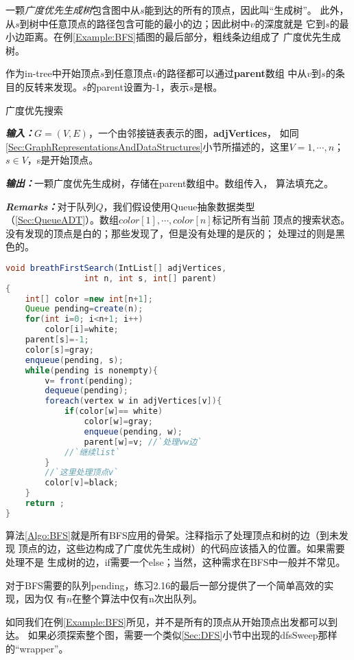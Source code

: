 一颗\emph{广度优先生成树}包含图中从$s$能到达的所有的顶点，因此叫“生成树”。
此外，从$s$到树中任意顶点的路径包含可能的最小的边；因此树中$v$的深度就是
它到$s$的最小边距离。在例\ref{Example:BFS}插图的最后部分，粗线条边组成了
广度优先生成树。

作为in-tree中开始顶点$s$到任意顶点$v$的路径都可以通过{\textbf{parent}}数组
中从$v$到$s$的条目的反转来发现。$s$的parent设置为-1，表示$s$是根。

\begin{algorithm}\label{Algo:BFS}
广度优先搜索

{\textbf{\emph{输入：}}}$G=(V,E)$，一个由邻接链表表示的图，{\textbf{adjVertices}}，
如同\ref{Sec:GraphRepresentationsAndDataStructures}小节所描述的，这里$V={1, \cdots, n}$；
$s\in V$，s是开始顶点。

{\textbf{\emph{输出：}}}一颗广度优先生成树，存储在parent数组中。数组传入，
算法填充之。

{\textbf{\emph{Remarks：}}}对于队列$Q$，我们假设使用Queue抽象数据类型
（\ref{Sec:QueueADT}）。数组$color[1], \cdots, color[n]$标记所有当前
顶点的搜索状态。没有发现的顶点是白的；那些发现了，但是没有处理的是灰的；
处理过的则是黑色的。
\end{algorithm}

\begin{lstlisting}[language={Java},keywordstyle=\color{blue!70}, commentstyle=\color{red!50!green!50!blue!50}]
void breathFirstSearch(IntList[] adjVertices,
                int n, int s, int[] parent)
{
    int[] color =new int[n+1];
    Queue pending=create(n);
    for(int i=0; i<n+1; i++)
        color[i]=white;
    parent[s]=-1;
    color[s]=gray;
    enqueue(pending, s);
    while(pending is nonempty){
        v= front(pending);
        dequeue(pending);
        foreach(vertex w in adjVertices[v]){
            if(color[w]== white)
                color[w]=gray;
                enqueue(pending, w);
                parent[w]=v; //`处理vw边`
            //`继续list`
        }
        //`这里处理顶点v`
        color[v]=black;
    }
    return ;
}
\end{lstlisting}

算法\ref{Algo:BFS}就是所有BFS应用的骨架。注释指示了处理顶点和树的边（到未发现
顶点的边，这些边构成了广度优先生成树）的代码应该插入的位置。如果需要处理不是
生成树的边，if需要一个else；当然，这种需求在BFS中一般并不常见。

对于BFS需要的队列pending，练习2.16的最后一部分提供了一个简单高效的实现，因为仅
有$n$在整个算法中仅有n次出队列。

如同我们在例\ref{Example:BFS}所见，并不是所有的顶点从开始顶点出发都可以到达。
如果必须探索整个图，需要一个类似\ref{Sec:DFS}小节中出现的dfsSweep那样的“wrapper”。

